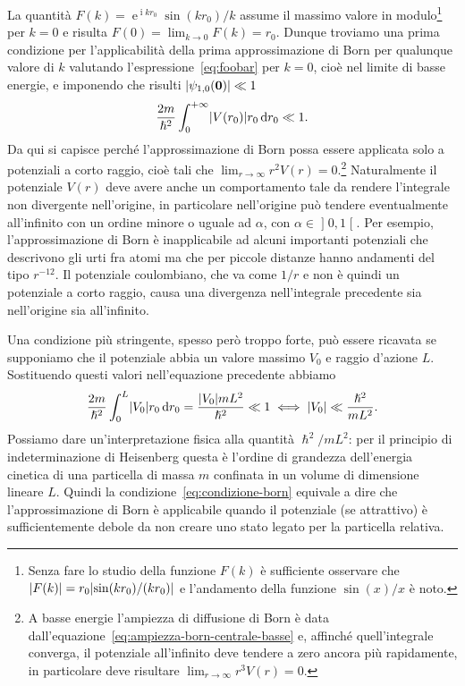 \documentclass[a4paper,fleqn,twoside,12pt]{article}
\newcommand*{\dd}{\mathop{}\!\mathrm{d}} %
\DeclareMathOperator{\e}{\mathrm{e}} %
\DeclareMathOperator{\uimm}{\mathrm{i}} %
\DeclarePairedDelimiter{\abs}{\lvert}{\rvert}
\begin{document}
La quantità $F(k)=\e^{\uimm kr_{0}}\sin(kr_{0})/k$ assume il massimo valore in
modulo\footnote{Senza fare lo studio della funzione $F(k)$ è sufficiente
  osservare che $\abs{F(k)} = r_{0} \abs{\sin(kr_{0})/(kr_{0})}$ e l'andamento
  della funzione $\sin(x)/x$ è noto.}
per $k = 0$ e risulta $F(0) = \lim_{k \to 0} F(k) = r_{0}$.  Dunque troviamo una
prima condizione per l'applicabilità della prima approssimazione di Born per
qualunque valore di $k$ valutando l'espressione~\eqref{eq:foobar} per $k=0$,
cioè nel limite di basse energie, e imponendo che risulti
$\abs{\psi_{1,0}(\bm{0})} \ll 1$
\begin{equation}
  \frac{2m}{\hslash^{2}}\int_{0}^{+\infty}\abs{V(r_{0})}r_{0}\dd r_{0} \ll 1.
\end{equation}
Da qui si capisce perché l'approssimazione di Born possa essere applicata solo a
potenziali a corto raggio, cioè tali che $\lim_{r \to \infty}r^{2}V(r) =
0$.\footnote{A
  basse energie l'ampiezza di diffusione di Born è data
  dall'equazione~\eqref{eq:ampiezza-born-centrale-basse} e, affinché
  quell'integrale converga, il potenziale all'infinito deve tendere a zero
  ancora più rapidamente, in particolare deve risultare
  $\lim_{r \to \infty}r^{3}V(r) = 0$.}
Naturalmente il potenziale $V(r)$ deve avere anche un comportamento tale da
rendere l'integrale non divergente nell'origine, in particolare nell'origine può
tendere eventualmente all'infinito con un ordine minore o uguale ad $\alpha$,
con $\alpha \in \mathopen{]}0, 1\mathclose{[}$.  Per esempio, l'approssimazione
di Born è inapplicabile ad alcuni importanti potenziali che descrivono gli urti
fra atomi ma che per piccole distanze hanno andamenti del tipo $r^{-12}$.  Il
potenziale coulombiano, che va come $1/r$ e non è quindi un potenziale a corto
raggio, causa una divergenza nell'integrale precedente sia nell'origine sia
all'infinito.

Una condizione più stringente, spesso però troppo forte, può essere ricavata se
supponiamo che il potenziale abbia un valore massimo $V_{0}$ e raggio d'azione
$L$.  Sostituendo questi valori nell'equazione precedente abbiamo
\begin{equation}
  \label{eq:condizione-born}
  \frac{2m}{\hslash^{2}}\int_{0}^{L}\abs{V_{0}}r_{0}\dd r_{0} =
  \frac{\abs{V_{0}}mL^{2}}{\hslash^{2}} \ll 1 \iff \abs{V_{0}} \ll
  \frac{\hslash^{2}}{mL^{2}}.
\end{equation}
Possiamo dare un'interpretazione fisica alla quantità $\hslash^{2}/mL^{2}$: per
il principio di indeterminazione di Heisenberg questa è l'ordine di grandezza
dell'energia cinetica di una particella di massa $m$ confinata in un volume di
dimensione lineare $L$.  Quindi la condizione~\eqref{eq:condizione-born}
equivale a dire che l'approssimazione di Born è applicabile quando il potenziale
(se attrattivo) è sufficientemente debole da non creare uno stato legato per la
particella relativa.
\end{document}
